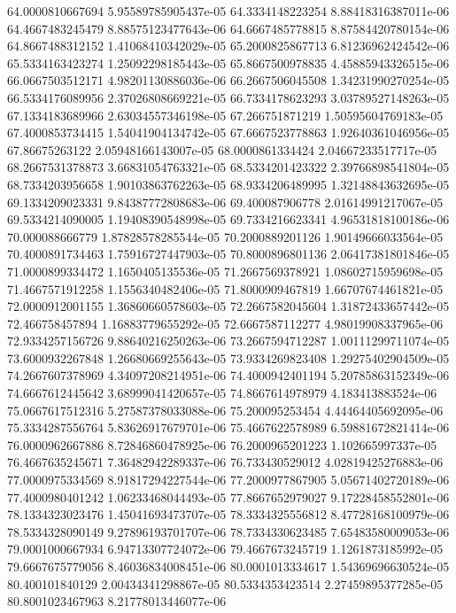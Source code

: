 {64.0000810667694 5.95589785905437e-05
64.3334148223254 8.88418316387011e-06
64.4667483245479 8.88575123477643e-06
64.6667485778815 8.87584420780154e-06
64.8667488312152 1.41068410342029e-05
65.2000825867713 6.81236962424542e-06
65.5334163423274 1.25092298185443e-05
65.8667500978835 4.45885943326515e-06
66.0667503512171 4.98201130886036e-06
66.2667506045508 1.34231990270254e-05
66.5334176089956 2.37026808669221e-05
66.7334178623293 3.03789527148263e-05
67.1334183689966 2.63034557346198e-05
67.266751871219 1.50595604769183e-05
67.4000853734415 1.54041904134742e-05
67.6667523778863 1.92640361046956e-05
67.86675263122 2.05948166143007e-05
68.0000861334424 2.04667233517717e-05
68.2667531378873 3.66831054763321e-05
68.5334201423322 2.39766898541804e-05
68.7334203956658 1.90103863762263e-05
68.9334206489995 1.32148843632695e-05
69.1334209023331 9.84387772808683e-06
69.400087906778 2.01614991217067e-05
69.5334214090005 1.19408390548998e-05
69.7334216623341 4.96531818100186e-06
70.000088666779 1.87828578285544e-05
70.2000889201126 1.90149666033564e-05
70.4000891734463 1.75916727447903e-05
70.8000896801136 2.06417381801846e-05
71.0000899334472 1.1650405135536e-05
71.2667569378921 1.08602715959698e-05
71.4667571912258 1.1556340482406e-05
71.8000909467819 1.66707674461821e-05
72.0000912001155 1.36860660578603e-05
72.2667582045604 1.31872433657442e-05
72.466758457894 1.16883779655292e-05
72.6667587112277 4.98019908337965e-06
72.9334257156726 9.88640216250263e-06
73.2667594712287 1.00111299711074e-05
73.6000932267848 1.26680669255643e-05
73.9334269823408 1.29275402904509e-05
74.2667607378969 4.34097208214951e-06
74.4000942401194 5.20785863152349e-06
74.6667612445642 3.68999041420657e-05
74.8667614978979 4.183413883524e-06
75.0667617512316 5.27587378033088e-06
75.200095253454 4.44464405692095e-06
75.3334287556764 5.83626917679701e-06
75.4667622578989 6.59881672821414e-06
76.0000962667886 8.72846860478925e-06
76.2000965201223 1.102665997337e-05
76.4667635245671 7.36482942289337e-06
76.733430529012 4.02819425276883e-06
77.0000975334569 8.91817294227544e-06
77.2000977867905 5.05671402720189e-06
77.4000980401242 1.06233468044493e-05
77.8667652979027 9.17228458552801e-06
78.1334323023476 1.45041693473707e-05
78.3334325556812 8.47728168100979e-06
78.5334328090149 9.27896193701707e-06
78.7334330623485 7.65483580009053e-06
79.0001000667934 6.94713307724072e-06
79.4667673245719 1.1261873185992e-05
79.6667675779056 8.46036834008451e-06
80.0001013334617 1.54369696630524e-05
80.400101840129 2.00434341298867e-05
80.5334353423514 2.27459895377285e-05
80.8001023467963 8.21778013446077e-06
}
